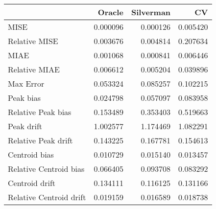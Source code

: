 \begin{tabular}{lrrr}
  \hline
 & Oracle & Silverman & CV \\ 
  \hline
MISE & 0.000096 & 0.000126 & 0.005420 \\ 
  Relative MISE & 0.003676 & 0.004814 & 0.207634 \\ 
  MIAE & 0.001068 & 0.000841 & 0.006446 \\ 
  Relative MIAE & 0.006612 & 0.005204 & 0.039896 \\ 
  Max Error & 0.053324 & 0.085257 & 0.102215 \\ 
  Peak bias & 0.024798 & 0.057097 & 0.083958 \\ 
  Relative Peak bias & 0.153489 & 0.353403 & 0.519663 \\ 
  Peak drift & 1.002577 & 1.174469 & 1.082291 \\ 
  Relative Peak drift & 0.143225 & 0.167781 & 0.154613 \\ 
  Centroid bias & 0.010729 & 0.015140 & 0.013457 \\ 
  Relative Centroid bias & 0.066405 & 0.093708 & 0.083292 \\ 
  Centroid drift & 0.134111 & 0.116125 & 0.131166 \\ 
  Relative Centroid drift & 0.019159 & 0.016589 & 0.018738 \\ 
   \hline
\end{tabular}
